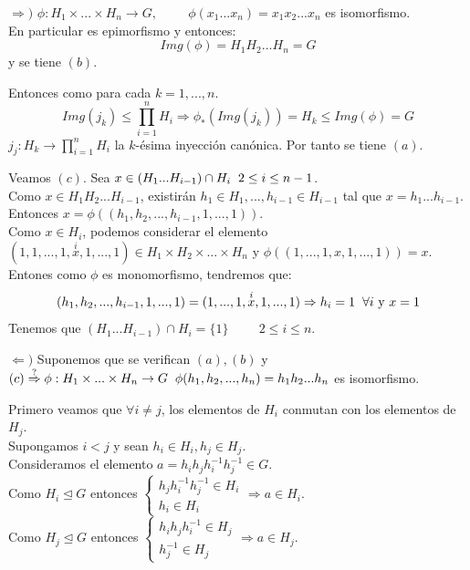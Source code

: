 \documentclass[11pt,a4paper]{article}
\begin{document}
\begin{enumerate*}
\item[$\Rightarrow)$] $\phi: H_{1} \times ... \times H_{n} \to G, \hspace{1cm} \phi(x_{1}...x_{n}) = x_{1}x_{2}...x_{n}$ es isomorfismo. \\
En particular es epimorfismo y entonces:
$$Img(\phi) = H_{1}H_{2}...H_{n} = G$$
y se tiene $(b)$.
 
Entonces como para cada $k = 1, ..., n$.
$$Img(j_{k}) \leqslant \prod_{i=1}^{n} H_{i} \Rightarrow \phi_{*} (Img(j_{k})) = H_{k} \leqslant Img(\phi) = G$$
$j_{j}: H_{k} \to \prod_{i=1}^{n} H_{i}$ la $k$-ésima inyección canónica. Por tanto se tiene $(a)$.


Veamos $(c)$. Sea $x \in (H_{1}...H_{i-1}) \cap H_{i} \hspace{0.2cm} 2 \leq i \leq n-1$. \\
Como $x \in H_{1}H_{2}...H_{i-1}$, existirán $h_{1} \in H_{1}, ..., h_{i-1} \in H_{i-1}$ tal que $x = h_{1}...h_{i-1}$. \\
Entonces $x = \phi((h_{1}, h_{2}, ..., h_{i-1}, 1, ..., 1))$. \\
Como $x \in H_{i}$, podemos considerar el elemento $(1, 1, ..., 1, \overset{i}{x}, 1, ..., 1) \in H_{1} \times H_{2} \times ... \times H_{n}$ y $\phi((1, ..., 1, x, 1, ..., 1)) = x$.
Entones como $\phi$ es monomorfismo, tendremos que:
$$(h_{1}, h_{2}, ..., h_{i-1}, 1, ..., 1) = (1, ..., 1, \overset{i}{x}, 1, ..., 1) \Rightarrow h_{i} = 1 \hspace{0.2cm} \forall i \text{ y } x = 1$$
Tenemos que $(H_{1}...H_{i-1}) \cap H_{i} = \{1\} \hspace{1cm} 2 \leq i \leq n$.
\item[$\Leftarrow)$] Suponemos que se verifican $(a), (b)$ y $(c) \overset{?}{\Rightarrow} \phi: H_{1} \times ... \times H_{n} \to G \hspace{0.2cm} \phi(h_{1}, h_{2}, ..., h_{n}) = h_{1}h_{2}...h_{n}$ es isomorfismo.

Primero veamos que $\forall i \neq j$, los elementos de $H_{i}$ conmutan con los elementos de $H_{j}$. \\
Supongamos $i < j$ y sean $h_{i} \in H_{i}, h_{j} \in H_{j}$. \\
Consideramos el elemento $a = h_{i}h_{j}h_{i}^{-1}h_{j}^{-1} \in G$. \\
Como $H_{i} \unlhd G$ entonces
$\begin{cases}
h_{j}h_{i}^{-1}h_{j}^{-1} \in H_{i} \\
h_{i} \in H_{i}
\end{cases}
\Rightarrow a \in H_{i}$. \\
Como $H_{j} \unlhd G$ entonces
$\begin{cases}
h_{i}h_{j}h_{i}^{-1} \in H_{j} \\
h_{j}^{-1} \in H_{j}
\end{cases}
\Rightarrow a \in H_{j}$.


\end{enumerate*}
\end{document}

